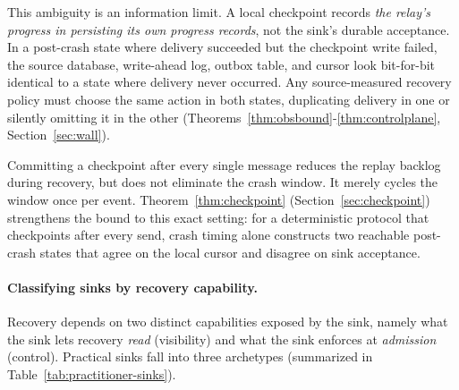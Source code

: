 \documentclass[sigplan,10pt]{acmart}
\theoremstyle{plain}
\theoremstyle{definition}
\begin{document}
This ambiguity is an information limit. A local checkpoint records
\emph{the relay's progress in persisting its own progress records}, not the
sink's durable acceptance. In a post-crash state where delivery succeeded
but the checkpoint write failed, the source database, write-ahead log,
outbox table, and cursor look bit-for-bit identical to a state where
delivery never occurred. Any source-measured recovery policy must choose the
same action in both states, duplicating delivery in one or silently omitting
it in the other (Theorems~\ref{thm:obsbound}-\ref{thm:controlplane},
Section~\ref{sec:wall}).

Committing a checkpoint after every single message reduces the replay
backlog during recovery, but does not eliminate the crash window. It merely
cycles the window once per event. Theorem~\ref{thm:checkpoint}
(Section~\ref{sec:checkpoint}) strengthens the bound to this exact setting:
for a deterministic protocol that checkpoints after every send, crash timing
alone constructs two reachable post-crash states that agree on the local cursor
and disagree on sink acceptance.

\paragraph{Classifying sinks by recovery capability.}
Recovery depends on two distinct capabilities exposed by the sink,
namely what the sink lets recovery \emph{read} (visibility) and what the sink
enforces at \emph{admission} (control). Practical sinks fall into three
archetypes (summarized in Table~\ref{tab:practitioner-sinks}).
\end{document}
